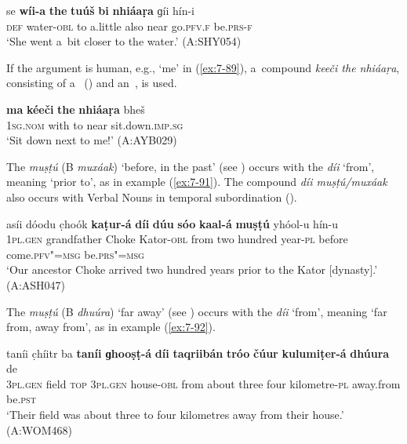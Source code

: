 \begin{exe}
\begin{exe}
\ex
\label{ex:7-88}
\gll se \textbf{wíi-a} \textbf{the} \textbf{tuúš} \textbf{bi} \textbf{nhiáaṛa} ɡíi hín-i \\
\textsc{def} water-\textsc{obl} to a.little also near go.\textsc{pfv.f} be.\textsc{prs-f} \\
\glt `She went a~bit closer to the water.' (A:SHY054)
\end{exe}

If the argument is human, e.g., `me' in (\ref{ex:7-89}), a~compound \textit{keeči the nhiáaṛa}, consisting of a~ () and an~, is used.

\begin{exe}
\ex
\label{ex:7-89}
\gll \textbf{ma} \textbf{kéeči} \textbf{the} \textbf{nhiáaṛa} bheš \\
\textsc{1sg.nom} with to near sit.down.\textsc{imp.sg} \\
\glt `Sit down next to me!' (A:AYB029)
\end{exe}


The  \textit{muṣṭú} (B \textit{muxáak}) `before, in the past' (see ) occurs with the  \textit{díi} `from', meaning `prior to', as in example (\ref{ex:7-91}). The compound \textit{díi muṣṭú/muxáak} also occurs with Verbal Nouns in temporal subordination (). 

\begin{exe}
\ex
\label{ex:7-91}
\gll asíi dóodu c̣hoók \textbf{kaṭur-á} \textbf{díi} \textbf{dúu} \textbf{sóo} \textbf{kaal-á} \textbf{muṣṭú} yhóol-u hín-u\\
\textsc{1pl.gen} grandfather Choke Kator-\textsc{obl} from two hundred year-\textsc{pl} before come.\textsc{pfv"=msg} be.\textsc{prs"=msg}\\
\glt `Our ancestor Choke arrived two hundred years prior to the Kator [dynasty].' (A:ASH047)
\end{exe}


 The  \textit{muṣṭú} (B \textit{dhuúra}) `far away' (see ) occurs with the  \textit{díi} `from', meaning `far from, away from', as in example (\ref{ex:7-92}). 

\begin{exe}
\ex
\label{ex:7-92}
\gll taníi c̣híitr ba \textbf{taníi} \textbf{ɡhooṣṭ-á} \textbf{díi} \textbf{taqriibán} \textbf{tróo} \textbf{čúur} \textbf{kulumiṭer-á} \textbf{dhúura} de\\
\textsc{3pl.gen} field \textsc{top} \textsc{3pl.gen} house-\textsc{obl} from about three four kilometre-\textsc{pl} away.from be.\textsc{pst}\\
\glt `Their field was about three to four kilometres away from their house.' (A:WOM468)
\end{exe}


\end{exe}
